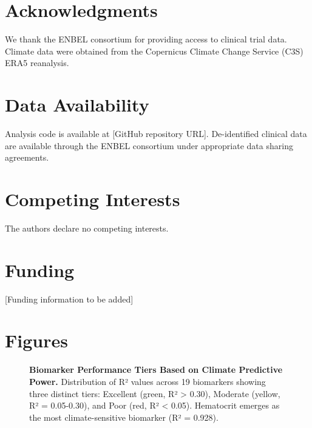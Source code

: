 \documentclass[11pt,a4paper]{article}
\begin{document}










\section*{Acknowledgments}

We thank the ENBEL consortium for providing access to clinical trial data. Climate data were obtained from the Copernicus Climate Change Service (C3S) ERA5 reanalysis.

\section*{Data Availability}

Analysis code is available at [GitHub repository URL]. De-identified clinical data are available through the ENBEL consortium under appropriate data sharing agreements.

\section*{Competing Interests}

The authors declare no competing interests.

\section*{Funding}

[Funding information to be added]




\clearpage

\section*{Figures}

\begin{figure}[ht]
    \centering
    \caption{\textbf{Biomarker Performance Tiers Based on Climate Predictive Power.} Distribution of R² values across 19 biomarkers showing three distinct tiers: Excellent (green, R² > 0.30), Moderate (yellow, R² = 0.05-0.30), and Poor (red, R² < 0.05). Hematocrit emerges as the most climate-sensitive biomarker (R² = 0.928).}
    \label{fig:performance_tiers}
\end{figure}
\end{document}
